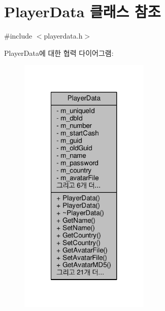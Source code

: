 \hypertarget{class_player_data}{\section{Player\-Data 클래스 참조}
\label{class_player_data}
}


{\ttfamily \#include $<$playerdata.\-h$>$}



Player\-Data에 대한 협력 다이어그램\-:
\nopagebreak
\begin{figure}[H]
\begin{center}
\leavevmode
\includegraphics[width=176pt]{class_player_data__coll__graph}
\end{center}
\end{figure}
